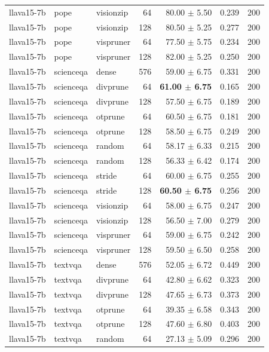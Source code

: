 \begin{tabular}{lllrrrr}
llava15-7b & pope & visionzip & 64 & 80.00 $\pm$ 5.50 & 0.239 & 200 \\
llava15-7b & pope & visionzip & 128 & 80.50 $\pm$ 5.25 & 0.277 & 200 \\
llava15-7b & pope & vispruner & 64 & 77.50 $\pm$ 5.75 & 0.234 & 200 \\
llava15-7b & pope & vispruner & 128 & 82.00 $\pm$ 5.25 & 0.250 & 200 \\
llava15-7b & scienceqa & dense & 576 & 59.00 $\pm$ 6.75 & 0.331 & 200 \\
llava15-7b & scienceqa & divprune & 64 & \textbf{61.00 $\pm$ 6.75} & 0.165 & 200 \\
llava15-7b & scienceqa & divprune & 128 & 57.50 $\pm$ 6.75 & 0.189 & 200 \\
llava15-7b & scienceqa & otprune & 64 & 60.50 $\pm$ 6.75 & 0.181 & 200 \\
llava15-7b & scienceqa & otprune & 128 & 58.50 $\pm$ 6.75 & 0.249 & 200 \\
llava15-7b & scienceqa & random & 64 & 58.17 $\pm$ 6.33 & 0.215 & 200 \\
llava15-7b & scienceqa & random & 128 & 56.33 $\pm$ 6.42 & 0.174 & 200 \\
llava15-7b & scienceqa & stride & 64 & 60.00 $\pm$ 6.75 & 0.255 & 200 \\
llava15-7b & scienceqa & stride & 128 & \textbf{60.50 $\pm$ 6.75} & 0.256 & 200 \\
llava15-7b & scienceqa & visionzip & 64 & 58.00 $\pm$ 6.75 & 0.247 & 200 \\
llava15-7b & scienceqa & visionzip & 128 & 56.50 $\pm$ 7.00 & 0.279 & 200 \\
llava15-7b & scienceqa & vispruner & 64 & 59.00 $\pm$ 6.75 & 0.242 & 200 \\
llava15-7b & scienceqa & vispruner & 128 & 59.50 $\pm$ 6.50 & 0.258 & 200 \\
llava15-7b & textvqa & dense & 576 & 52.05 $\pm$ 6.72 & 0.449 & 200 \\
llava15-7b & textvqa & divprune & 64 & 42.80 $\pm$ 6.62 & 0.323 & 200 \\
llava15-7b & textvqa & divprune & 128 & 47.65 $\pm$ 6.73 & 0.373 & 200 \\
llava15-7b & textvqa & otprune & 64 & 39.35 $\pm$ 6.58 & 0.343 & 200 \\
llava15-7b & textvqa & otprune & 128 & 47.60 $\pm$ 6.80 & 0.403 & 200 \\
llava15-7b & textvqa & random & 64 & 27.13 $\pm$ 5.09 & 0.296 & 200 \\

\end{tabular}
